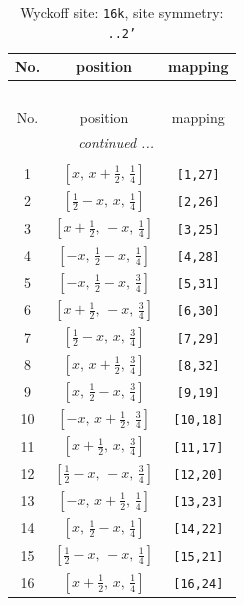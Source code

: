 \documentclass[fleqn,8pt]{jsarticle}
\begin{document}
\begin{longtable}{ccc}
\caption{Wyckoff site: {\tt 16k}, site symmetry: {\tt ..2'}}
 \\
 \hline \hline
No. & position & mapping \\ \hline \endfirsthead

\multicolumn{2}{l}{\tablename\ \thetable{}} \\
 \hline \hline
No. & position & mapping \\ \hline \endhead

 \hline \hline
\multicolumn{2}{r}{\footnotesize\it continued ...} \\ \endfoot

 \hline \hline
\multicolumn{2}{r}{} \\ \endlastfoot

1 & $\left[ x,\, x + \frac{1}{2},\, \frac{1}{4} \right]$ & {\tt [1,27]} \\ \hline
2 & $\left[ \frac{1}{2} - x,\, x,\, \frac{1}{4} \right]$ & {\tt [2,26]} \\ \hline
3 & $\left[ x + \frac{1}{2},\, - x,\, \frac{1}{4} \right]$ & {\tt [3,25]} \\ \hline
4 & $\left[ - x,\, \frac{1}{2} - x,\, \frac{1}{4} \right]$ & {\tt [4,28]} \\ \hline
5 & $\left[ - x,\, \frac{1}{2} - x,\, \frac{3}{4} \right]$ & {\tt [5,31]} \\ \hline
6 & $\left[ x + \frac{1}{2},\, - x,\, \frac{3}{4} \right]$ & {\tt [6,30]} \\ \hline
7 & $\left[ \frac{1}{2} - x,\, x,\, \frac{3}{4} \right]$ & {\tt [7,29]} \\ \hline
8 & $\left[ x,\, x + \frac{1}{2},\, \frac{3}{4} \right]$ & {\tt [8,32]} \\ \hline
9 & $\left[ x,\, \frac{1}{2} - x,\, \frac{3}{4} \right]$ & {\tt [9,19]} \\ \hline
10 & $\left[ - x,\, x + \frac{1}{2},\, \frac{3}{4} \right]$ & {\tt [10,18]} \\ \hline
11 & $\left[ x + \frac{1}{2},\, x,\, \frac{3}{4} \right]$ & {\tt [11,17]} \\ \hline
12 & $\left[ \frac{1}{2} - x,\, - x,\, \frac{3}{4} \right]$ & {\tt [12,20]} \\ \hline
13 & $\left[ - x,\, x + \frac{1}{2},\, \frac{1}{4} \right]$ & {\tt [13,23]} \\ \hline
14 & $\left[ x,\, \frac{1}{2} - x,\, \frac{1}{4} \right]$ & {\tt [14,22]} \\ \hline
15 & $\left[ \frac{1}{2} - x,\, - x,\, \frac{1}{4} \right]$ & {\tt [15,21]} \\ \hline
16 & $\left[ x + \frac{1}{2},\, x,\, \frac{1}{4} \right]$ & {\tt [16,24]} \\
\end{longtable}
\end{document}
